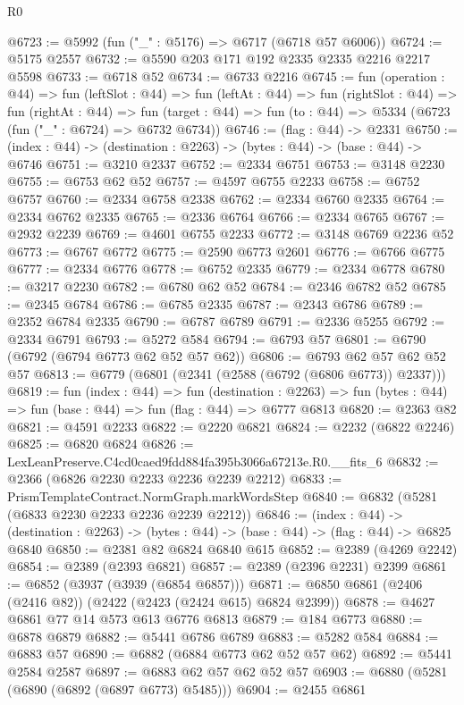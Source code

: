 \begin{lexlean}{R0}
\begin{coremodule}
@6723 := @5992 (fun ("_" : @5176) => @6717 (@6718 @57 @6006))
@6724 := @5175 @2557
@6732 := @5590 @203 @171 @192 @2335 @2335 @2216 @2217 @5598
@6733 := @6718 @52
@6734 := @6733 @2216
@6745 := fun (operation : @44) =>
  fun (leftSlot : @44) =>
  fun (leftAt : @44) =>
  fun (rightSlot : @44) =>
  fun (rightAt : @44) =>
  fun (target : @44) => fun (to : @44) => @5334 (@6723 (fun ("_" : @6724) => @6732 @6734))
@6746 := (flag : @44) -> @2331
@6750 := (index : @44) -> (destination : @2263) -> (bytes : @44) -> (base : @44) -> @6746
@6751 := @3210 @2337
@6752 := @2334 @6751
@6753 := @3148 @2230
@6755 := @6753 @62 @52
@6757 := @4597 @6755 @2233
@6758 := @6752 @6757
@6760 := @2334 @6758 @2338
@6762 := @2334 @6760 @2335
@6764 := @2334 @6762 @2335
@6765 := @2336 @6764
@6766 := @2334 @6765
@6767 := @2932 @2239
@6769 := @4601 @6755 @2233
@6772 := @3148 @6769 @2236 @52
@6773 := @6767 @6772
@6775 := @2590 @6773 @2601
@6776 := @6766 @6775
@6777 := @2334 @6776
@6778 := @6752 @2335
@6779 := @2334 @6778
@6780 := @3217 @2230
@6782 := @6780 @62 @52
@6784 := @2346 @6782 @52
@6785 := @2345 @6784
@6786 := @6785 @2335
@6787 := @2343 @6786
@6789 := @2352 @6784 @2335
@6790 := @6787 @6789
@6791 := @2336 @5255
@6792 := @2334 @6791
@6793 := @5272 @584
@6794 := @6793 @57
@6801 := @6790 (@6792 (@6794 @6773 @62 @52 @57 @62))
@6806 := @6793 @62 @57 @62 @52 @57
@6813 := @6779 (@6801 (@2341 (@2588 (@6792 (@6806 @6773)) @2337)))
@6819 := fun (index : @44) =>
  fun (destination : @2263) =>
  fun (bytes : @44) => fun (base : @44) => fun (flag : @44) => @6777 @6813
@6820 := @2363 @82
@6821 := @4591 @2233
@6822 := @2220 @6821
@6824 := @2232 (@6822 @2246)
@6825 := @6820 @6824
@6826 := LexLeanPreserve.C4cd0caed9fdd884fa395b3066a67213e.R0.__fits_6
@6832 := @2366 (@6826 @2230 @2233 @2236 @2239 @2212)
@6833 := PrismTemplateContract.NormGraph.markWordsStep
@6840 := @6832 (@5281 (@6833 @2230 @2233 @2236 @2239 @2212))
@6846 := (index : @44) ->
  (destination : @2263) -> (bytes : @44) -> (base : @44) -> (flag : @44) -> @6825 @6840
@6850 := @2381 @82 @6824 @6840 @615
@6852 := @2389 (@4269 @2242)
@6854 := @2389 (@2393 @6821)
@6857 := @2389 (@2396 @2231) @2399
@6861 := @6852 (@3937 (@3939 (@6854 @6857)))
@6871 := @6850 @6861 (@2406 (@2416 @82)) (@2422 (@2423 (@2424 @615) @6824 @2399))
@6878 := @4627 @6861 @77 @14 @573 @613 @6776 @6813
@6879 := @184 @6773
@6880 := @6878 @6879
@6882 := @5441 @6786 @6789
@6883 := @5282 @584
@6884 := @6883 @57
@6890 := @6882 (@6884 @6773 @62 @52 @57 @62)
@6892 := @5441 @2584 @2587
@6897 := @6883 @62 @57 @62 @52 @57
@6903 := @6880 (@5281 (@6890 (@6892 (@6897 @6773) @5485)))
@6904 := @2455 @6861

\end{coremodule}
\end{lexlean}

